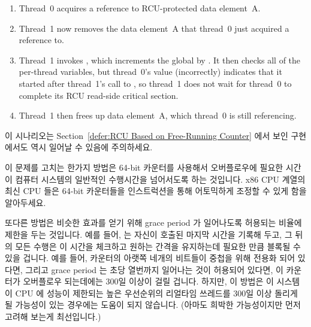 {\begin{enumerate}
	\item	Thread~0 acquires a reference to RCU-protected data
		element~A.
	\item	Thread~1 now removes the data element~A that thread~0
		just acquired a reference to.
	\item	Thread~1 invokes , which
		increments the global  by
		.
		It then checks all of the per-thread 
		variables, but thread~0's value (incorrectly) indicates
		that it started after thread~1's call to
		, so thread~1 does not wait
		for thread~0 to complete its RCU read-side critical
		section.
	\item	Thread~1 then frees up data element~A, which thread~0
		is still referencing.
	\fi
	\end{enumerate}

	이 시나리오는
	Section~\ref{defer:RCU Based on Free-Running Counter} 에서 보인
	구현에서도 역시 일어날 수 있음에 주의하세요.

	이 문제를 고치는 한가지 방법은 64-bit 카운터를 사용해서 오버플로우에
	필요한 시간이 컴퓨터 시스템의 일반적인 수행시간을 넘어서도록 하는
	것입니다.
	x86 CPU 계열의 최신 CPU 들은 64-bit 카운터들을 
	인스트럭션을 통해 어토믹하게 조정할 수 있게 함을 알아두세요.
	\iffalse

	Note that scenario can also occur in the implementation presented in
	Section~\ref{defer:RCU Based on Free-Running Counter}.

	One strategy for fixing this problem is to use 64-bit
	counters so that the time required to overflow them would exceed
	the useful lifetime of the computer system.
	Note that non-antique members of the 32-bit x86 CPU family
	allow atomic manipulation of 64-bit counters via the
	\co{cmpxchg64b} instruction.
	\fi

	또다른 방법은 비슷한 효과를 얻기 위해 grace period 가 일어나도록
	허용되는 비율에 제한을 두는 것입니다.
	예를 들어,  는 자신이 호출된 마지막 시간을 기록해
	두고, 그 뒤의 모든 수행은 이 시간을 체크하고 원하는 간격을 유지하는데
	필요한 만큼 블록될 수 있을 겁니다.
	예를 들어, 카운터의 아랫쪽 네개의 비트들이 중첩을 위해 전용화 되어
	있다면, 그리고 grace period 는 초당 열번까지 일어나는 것이 허용되어
	있다면, 이 카운터가 오버플로우 되는데에는 300일 이상이 걸릴 겁니다.
	하지만, 이 방법은 이 시스템이 CPU 에 성능이 제한되는 높은 우선순위의
	리얼타임 쓰레드를 300일 이상 돌리게 될 가능성이 있는 경우에는 도움이
	되지 않습니다.
	(아마도 희박한 가능성이지만 먼저 고려해 보는게 최선입니다.)
	\iffalse

}
